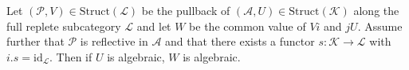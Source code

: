 Let $(\mathcal{P}, V) \in \text{Struct}(\mathcal{L})$ be the pullback of $(\mathcal{A}, U) \in \text{Struct}(\mathcal{K})$ along the full replete subcategory $\mathcal{L}$ and let $W$ be the common value of $Vi$ and $jU$. Assume further that $\mathcal{P}$ is reflective in $\mathcal{A}$ and that there exists a functor $s: \mathcal{K} \longrightarrow \mathcal{L}$ with $i.s = \text{id}_{\mathcal{L}}$. Then if $U$ is algebraic, $W$ is algebraic.
